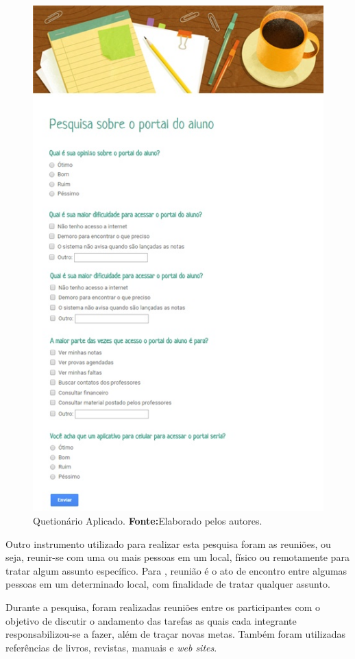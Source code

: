 	\begin{figure}[h!]
		\centerline{\includegraphics[scale=1]{./imagens/2_q_metodologico/3_instrumentos/instrumentos.png}}
		\caption[Quetionário Aplicado]{Quetionário Aplicado.
			\textbf{Fonte:}Elaborado pelos autores.}
		\label{fig:qm1}
	\end{figure}
	
	
	

	\par Outro instrumento utilizado para realizar esta pesquisa foram as reuniões,
ou seja, reunir-se com uma ou mais pessoas em um local, físico ou remotamente
para tratar algum assunto específico. Para , reunião é o ato de
encontro entre algumas pessoas em um determinado local, com finalidade de tratar
qualquer assunto.

	\par Durante a pesquisa, foram realizadas reuniões entre os participantes com
o objetivo de discutir o andamento das tarefas as quais cada integrante
responsabilizou-se a fazer, além de traçar novas metas. Também foram utilizadas
referências de livros, revistas, manuais e \textit{web sites}.

\pagebreak